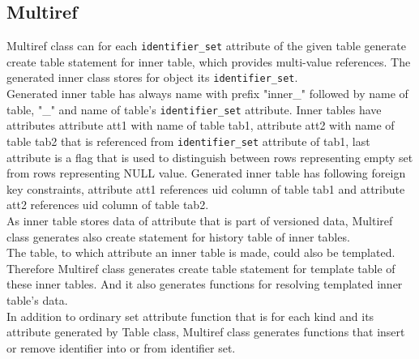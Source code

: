 \documentclass[deska]{subfiles}
\begin{document}
\subsection{Multiref}
Multiref class can for each {\tt identifier\_set} attribute of the given table generate create table statement for inner table, which provides multi-value references. The generated inner class stores for object its {\tt identifier\_set}.\\
Generated inner table has always name with prefix "inner\_" followed by name of table, "\_" and name of table's {\tt identifier\_set} attribute. Inner tables have attributes attribute att1 with name of table tab1, attribute att2 with name of table tab2 that is referenced from {\tt identifier\_set} attribute of tab1, last attribute is a flag that is used to distinguish between rows representing empty set from rows representing NULL value. Generated inner table has following foreign key constraints, attribute att1 references uid column of table tab1 and attribute att2 references uid column of table tab2.\\
As inner table stores data of attribute that is part of versioned data, Multiref class generates also create statement for history table of inner tables.\\ 
The table, to which attribute an inner table is made, could also be templated. Therefore Multiref class generates create table statement for template table of these inner tables. And it also generates functions for resolving templated inner table's data.\\
In addition to ordinary set attribute function that is for each kind and its attribute generated by Table class, Multiref class generates functions that insert or remove identifier into or from identifier set.
\end{document}
